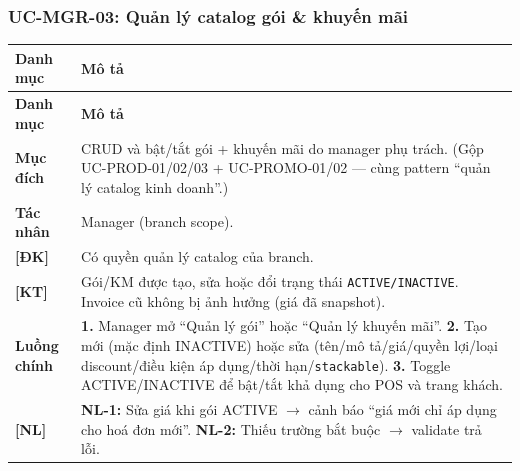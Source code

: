 \subsubsection{UC-MGR-03: Quản lý catalog gói \& khuyến mãi}
\begingroup
\renewcommand{\arraystretch}{1.3}
\begin{longtable}{|>{\centering\arraybackslash}m{3cm}|>{\raggedright\arraybackslash}m{12cm}|}
\hline
\textbf{Danh mục} & \textbf{Mô tả} \\ \hline
\endfirsthead
\hline
\textbf{Danh mục} & \textbf{Mô tả} \\ \hline
\endhead
\hline
\endfoot
\textbf{Mục đích} & CRUD và bật/tắt gói + khuyến mãi do manager phụ trách. (Gộp UC-PROD-01/02/03 + UC-PROMO-01/02 — cùng pattern ``quản lý catalog kinh doanh''.) \\
\hline
\textbf{Tác nhân} & Manager (branch scope). \\
\hline
\textbf{[ĐK]} & Có quyền quản lý catalog của branch. \\
\hline
\textbf{[KT]} & Gói/KM được tạo, sửa hoặc đổi trạng thái \texttt{ACTIVE/INACTIVE}. Invoice cũ không bị ảnh hưởng (giá đã snapshot). \\
\hline
\textbf{Luồng chính} & \textbf{1.} Manager mở ``Quản lý gói'' hoặc ``Quản lý khuyến mãi''. \textbf{2.} Tạo mới (mặc định INACTIVE) hoặc sửa (tên/mô tả/giá/quyền lợi/loại discount/điều kiện áp dụng/thời hạn/\texttt{stackable}). \textbf{3.} Toggle ACTIVE/INACTIVE để bật/tắt khả dụng cho POS và trang khách. \\
\hline
\textbf{[NL]} & \textbf{NL-1:} Sửa giá khi gói ACTIVE $\rightarrow$ cảnh báo ``giá mới chỉ áp dụng cho hoá đơn mới''. \textbf{NL-2:} Thiếu trường bắt buộc $\rightarrow$ validate trả lỗi. \\
\hline
\end{longtable}
\endgroup

